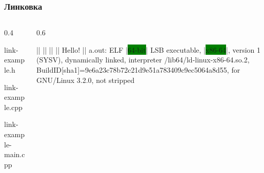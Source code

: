 \documentclass[compress, 10pt, aspectratio=169]{beamer}
\begin{document}
\begin{frame}[fragile]

    \frametitle{Линковка}

    \begin{columns}[T]

        \begin{column}{0.4\textwidth}

                {link-example.h}

                {link-example.cpp}

                {link-example-main.cpp}

        \end{column}

        \begin{column}{0.6\textwidth}

            \begin{terminalwindow}[||]
||
||
||
||
Hello!
||
a.out: ELF |\colorbox{green}{64-bit}| LSB executable, |\colorbox{green}{x86-64}|, version 1 (SYSV), dynamically linked, interpreter /lib64/ld-linux-x86-64.so.2, BuildID[sha1]=9e6a23c78b72c21d9e51a783409c9ec5064a8d55, for GNU/Linux 3.2.0, not stripped
            \end{terminalwindow}

        \end{column}

    \end{columns}

\end{frame}
\end{document}
